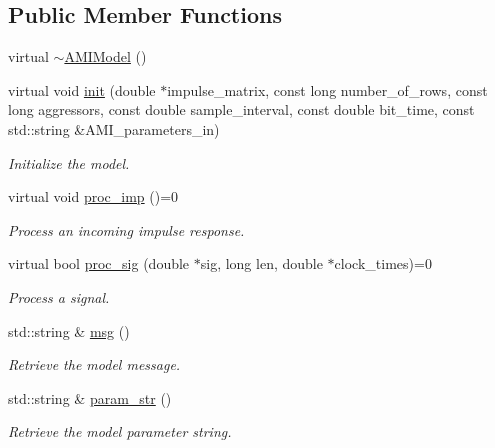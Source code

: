 \subsection*{Public Member Functions}
\begin{DoxyCompactItemize}
\item 
virtual \hyperlink{class_a_m_i_model_a6c266bc8306cef0ed802c49c8847e8fc}{$\sim$\+A\+M\+I\+Model} ()
\item 
virtual void \hyperlink{class_a_m_i_model_a8f45652e216686d0efa8db7e9dc0e915}{init} (double $\ast$impulse\+\_\+matrix, const long number\+\_\+of\+\_\+rows, const long aggressors, const double sample\+\_\+interval, const double bit\+\_\+time, const std\+::string \&A\+M\+I\+\_\+parameters\+\_\+in)
\begin{DoxyCompactList}\small\item\em Initialize the model. \end{DoxyCompactList}\item 
virtual void \hyperlink{class_a_m_i_model_a52d1f23607e7f12fa1ab61d809231c11}{proc\+\_\+imp} ()=0
\begin{DoxyCompactList}\small\item\em Process an incoming impulse response. \end{DoxyCompactList}\item 
virtual bool \hyperlink{class_a_m_i_model_abb1d05835230a1b0e8f6b98002d8f4ef}{proc\+\_\+sig} (double $\ast$sig, long len, double $\ast$clock\+\_\+times)=0
\begin{DoxyCompactList}\small\item\em Process a signal. \end{DoxyCompactList}\item 
std\+::string \& \hyperlink{class_a_m_i_model_ae65d47400fd3736682c229dab31392ad}{msg} ()
\begin{DoxyCompactList}\small\item\em Retrieve the model message. \end{DoxyCompactList}\item 
std\+::string \& \hyperlink{class_a_m_i_model_abb8b57f839746e955774d7bc8f1b5d02}{param\+\_\+str} ()
\begin{DoxyCompactList}\small\item\em Retrieve the model parameter string. \end{DoxyCompactList}\end{DoxyCompactItemize}
